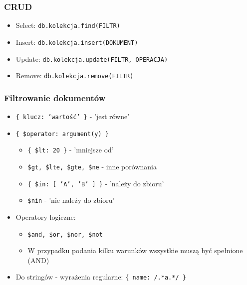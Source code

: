 \documentclass{beamer}
\begin{document}
  \begin{frame}
    \frametitle{CRUD}
    \begin{itemize}
      \item Select: \texttt{db.kolekcja.find(FILTR)}
      
      \item Insert: \texttt{db.kolekcja.insert(DOKUMENT)}
      
      \item Update: \texttt{db.kolekcja.update(FILTR, OPERACJA)}
      
      \item Remove: \texttt{db.kolekcja.remove(FILTR)}
      
    \end{itemize}
  \end{frame}

  \begin{frame}
    \frametitle{Filtrowanie dokumentów}
    \begin{itemize}
      \item \texttt{\{ klucz: 'wartość' \}} - 'jest równe'
      \item \texttt{\{ \$operator: argument(y) \}}
      \begin{itemize}
        \item \texttt{\{ \$lt: 20 \}} - 'mniejsze od'
        \item \texttt{\$gt, \$lte, \$gte, \$ne} - inne porównania
        \item \texttt{\{ \$in: [ 'A', 'B' ] \}} - 'należy do zbioru'
        \item \texttt{\$nin} - 'nie należy do zbioru'
      \end{itemize}
      \item Operatory logiczne:
      \begin{itemize}
        \item \texttt{\$and, \$or, \$nor, \$not}
        \item W przypadku podania kilku warunków wszystkie muszą być spełnione (AND)
      \end{itemize}
      \item Do stringów - wyrażenia regularne: \texttt{\{ name: /.*a.*/ \}}
    \end{itemize}
    
  \end{frame}
\end{document}
